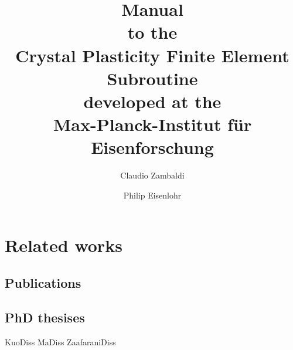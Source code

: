 \documentclass[USenglish]{scrbook}
\begin{document}
\title{Manual\\[1cm]\LARGE to the \\[3mm] Crystal Plasticity Finite Element Subroutine \\[3mm] developed at the \\[3mm] Max-Planck-Institut f\"ur Eisenforschung}
\author{Claudio Zambaldi \and Philip Eisenlohr}
\maketitle

%

\frontmatter
%
\tableofcontents
\listoftables
\listoffigures
%
\mainmatter

\renewcommand{\chaptermark}[1]{\markboth{{\thechapter\ \ #1}}{}}










\appendix
\cleardoublepage {} %



\chapter{Related works}
\section{Publications}

\section{PhD thesises}
KuoDiss MaDiss ZaafaraniDiss



\end{document}
